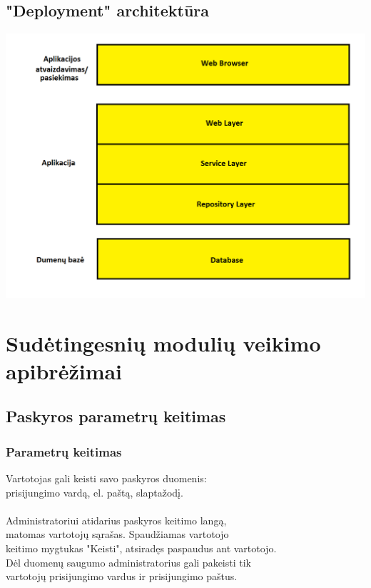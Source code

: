 \documentclass[a4paper,12pt]{article}
\begin{document}
\subsection{"Deployment" architektūra}
\includegraphics[scale=0.5]{architektura3}




\section{Sudėtingesnių modulių veikimo apibrėžimai}

\subsection{ Paskyros parametrų keitimas }

\subsubsection{Parametrų keitimas}

Vartotojas gali keisti savo paskyros duomenis: \\
	prisijungimo vardą, el. paštą, slaptažodį. \\\\
	
Administratoriui atidarius paskyros keitimo langą,\\
matomas vartotojų sąrašas. Spaudžiamas vartotojo \\
keitimo mygtukas "Keisti", atsiradęs paspaudus ant vartotojo.\\
Dėl duomenų saugumo administratorius gali pakeisti tik\\
vartotojų prisijungimo vardus ir prisijungimo paštus. \\\\
\end{document}
